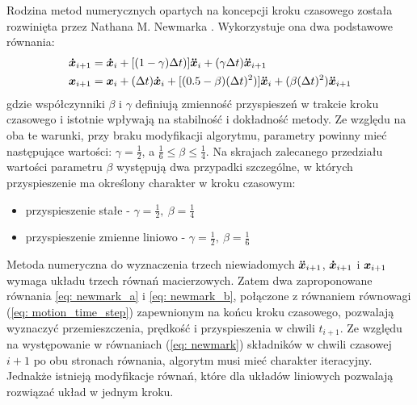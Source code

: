Rodzina metod numerycznych opartych na koncepcji kroku czasowego została rozwinięta przez Nathana M. Newmarka \parencite{Newmark1959}. Wykorzystuje ona dwa podstawowe równania:
\begin{subequations} \label{eq: newmark}
	\begin{align}
		\bm{\dot{x}}_{i+1} &= \bm{\dot{x}}_{i} + [(1-\gamma)\Delta t)]\bm{\ddot{x}}_{i} + (\gamma\Delta t)\bm{\ddot{x}}_{i+1} 
		\label{eq: newmark_a}\\
		\bm{x}_{i+1} &= \bm{x}_{i} + (\Delta t)\bm{\dot{x}}_{i} + [(0.5-\beta)(\Delta t)^2)]\bm{\ddot{x}}_{i}+ (\beta(\Delta t)^2)\bm{\ddot{x}}_{i+1} 
		\label{eq: newmark_b}
	\end{align}
\end{subequations}
gdzie współczynniki $\beta$ i $\gamma$ definiują zmienność przyspieszeń w trakcie kroku czasowego i istotnie wpływają na stabilność i dokładność metody. Ze względu na oba te warunki, przy braku modyfikacji algorytmu, parametry powinny mieć następujące wartości: $\gamma = \frac{1}{2}$, a $ \frac{1}{6}\leq \beta \leq \frac{1}{4}$. Na skrajach zalecanego przedziału wartości parametru $\beta$ występują dwa przypadki szczególne, w których przyspieszenie ma określony charakter w kroku czasowym:
\begin{itemize}[noitemsep]
	\item przyspieszenie stałe - $\gamma = \frac{1}{2},\: \beta = \frac{1}{4}$
	\item przyspieszenie zmienne liniowo - $\gamma = \frac{1}{2},\: \beta = \frac{1}{6}$
\end{itemize}
Metoda numeryczna do wyznaczenia trzech niewiadomych $\bm{\ddot{x}}_{i+1}$, $\bm{\dot{x}}_{i+1}$ i $\bm{x}_{i+1}$ wymaga układu trzech równań macierzowych. Zatem dwa zaproponowane równania \ref{eq: newmark_a} i \ref{eq: newmark_b}, połączone z równaniem równowagi (\ref{eq: motion_time_step}) zapewnionym na końcu kroku czasowego, pozwalają wyznaczyć przemieszczenia, prędkość i przyspieszenia w chwili $t_{i+1}$. Ze względu na występowanie w równaniach (\ref{eq: newmark}) składników w chwili czasowej $i+1$ po obu stronach równania, algorytm musi mieć charakter iteracyjny. Jednakże istnieją modyfikacje równań, które dla układów liniowych pozwalają rozwiązać układ w jednym kroku.

